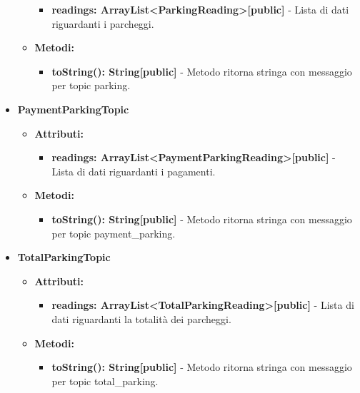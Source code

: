\documentclass[8pt]{article}
\begin{document}
\begin{itemize}
\begin{itemize}
\begin{itemize}
            \item \textbf{readings: ArrayList<ParkingReading>[public]} - Lista di dati riguardanti i parcheggi.
        \end{itemize}
    \end{itemize}
    \begin{itemize}
        \item \textbf{Metodi:}
        \begin{itemize}
            \item \textbf{toString(): String[public]} - Metodo ritorna stringa con messaggio per topic parking.
        \end{itemize}
    \end{itemize}
    \item \textbf{PaymentParkingTopic}
    \begin{itemize}
        \item \textbf{Attributi:}
        \begin{itemize}
            \item \textbf{readings: ArrayList<PaymentParkingReading>[public]} - Lista di dati riguardanti i pagamenti.
        \end{itemize}
    \end{itemize}
    \begin{itemize}
        \item \textbf{Metodi:}
        \begin{itemize}
            \item \textbf{toString(): String[public]} - Metodo ritorna stringa con messaggio per topic payment\_parking.
        \end{itemize}
    \end{itemize}
    \item \textbf{TotalParkingTopic}
    \begin{itemize}
        \item \textbf{Attributi:}
        \begin{itemize}
            \item \textbf{readings: ArrayList<TotalParkingReading>[public]} - Lista di dati riguardanti la totalità dei parcheggi.
        \end{itemize}
    \end{itemize}
    \begin{itemize}
        \item \textbf{Metodi:}
        \begin{itemize}
            \item \textbf{toString(): String[public]} - Metodo ritorna stringa con messaggio per topic total\_parking.

\end{itemize}
\end{itemize}
\end{itemize}
\end{document}
